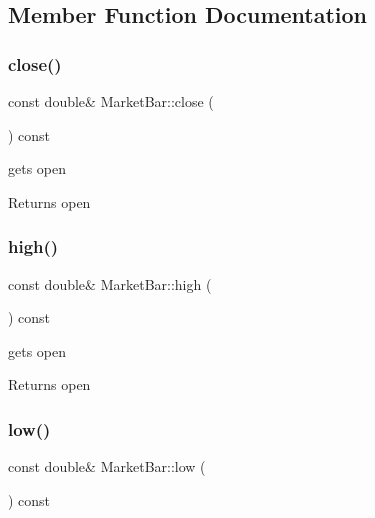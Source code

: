\subsection{Member Function Documentation}
\mbox{\label{classMarketBar_a74369b5be9dd83b2410e2bc3e50b8437}} 
\subsubsection{\texorpdfstring{close()}{close()}}
{\footnotesize\ttfamily const double\& Market\+Bar\+::close (\begin{DoxyParamCaption}{ }\end{DoxyParamCaption}) const}



gets open 

\begin{DoxyReturn}{Returns}
open 
\end{DoxyReturn}
\mbox{\label{classMarketBar_a77bb9fef6fe9ba65f1b0c7cc0e94a6b7}} 
\subsubsection{\texorpdfstring{high()}{high()}}
{\footnotesize\ttfamily const double\& Market\+Bar\+::high (\begin{DoxyParamCaption}{ }\end{DoxyParamCaption}) const}



gets open 

\begin{DoxyReturn}{Returns}
open 
\end{DoxyReturn}
\mbox{\label{classMarketBar_aa1d4769489e2ce450d7e376fdfcb6ef4}} 
\subsubsection{\texorpdfstring{low()}{low()}}
{\footnotesize\ttfamily const double\& Market\+Bar\+::low (\begin{DoxyParamCaption}{ }\end{DoxyParamCaption}) const}



